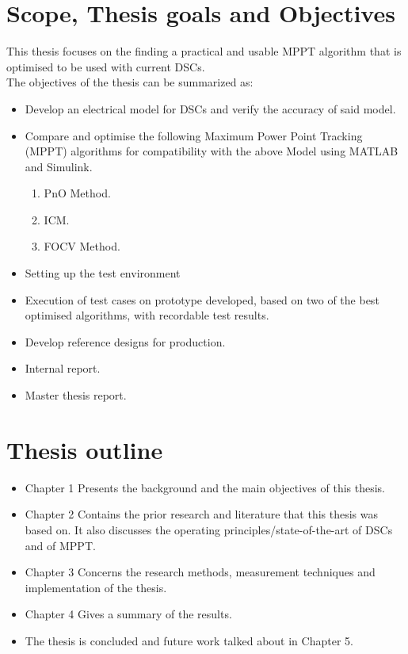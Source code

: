  
 \section{Scope, Thesis goals and Objectives}

This thesis focuses on the finding a practical and usable \ac{MPPT} algorithm that is optimised to be used with current \ac{DSCs}.\\


The objectives of the thesis can be summarized as:
\begin{itemize}

\item Develop an electrical model for DSCs and verify the accuracy of said model.
 
\item Compare and optimise the following Maximum Power Point Tracking (MPPT) algorithms for compatibility with the above Model using MATLAB{\textregistered} and Simulink{\textregistered}.
	\begin{enumerate}
		\item \ac{PnO} Method.
		\item \ac{ICM}.
		\item \ac{FOCV} Method.
		
	\end{enumerate}
\item Setting up the test environment   
\item Execution of test cases on prototype developed, based on two of the best optimised algorithms, with recordable test results.
\item Develop reference designs for production.
\item Internal report.
\item  Master thesis report. 
\end {itemize}

\section{Thesis outline}
\begin{itemize}
\item Chapter 1 Presents the background and the main objectives of this thesis. \\
\item Chapter 2 Contains the prior research and literature that this thesis was based on. It also discusses the operating principles/state-of-the-art  of \ac{DSCs} and of \ac{MPPT}. \\
\item Chapter 3 Concerns the  research methods, measurement techniques and implementation of the thesis.
\item Chapter 4 Gives a summary of the results. 
\item The thesis is concluded and future work talked about in Chapter 5.
\end {itemize}

